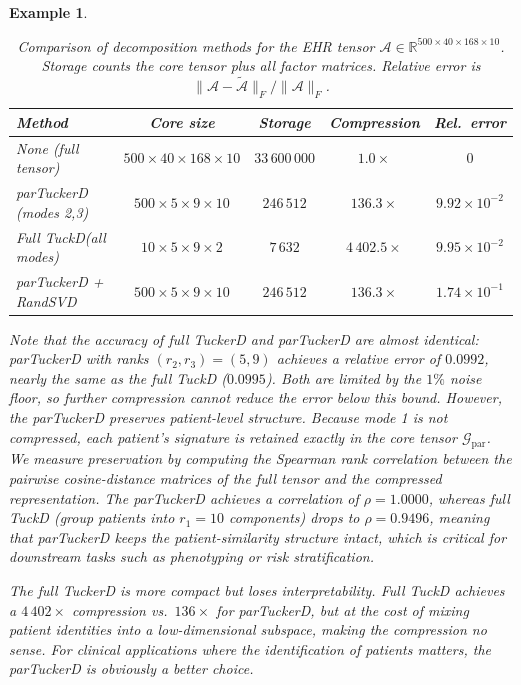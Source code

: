 \documentclass[11pt, oneside]{article}  %
\newtheorem{exm}[thm]{Example}
\newcommand{\RR}{\mathbb{R}}
\newcommand{\A}{\mathcal{A}}
\newcommand{\caG}{\mathcal{G}}
\begin{document}
\begin{exm}
\begin{table}[htbp]
\centering
\caption{Comparison of decomposition methods for the EHR tensor $\A\in\RR^{500\times 40\times 168\times 10}$.  Storage counts the core tensor plus all factor matrices.  Relative error is $\|\A-\widetilde{\A}\|_F/\|\A\|_F$.}
\label{tab:compare}
\begin{tabular}{@{}lcccc@{}}
\toprule
\textbf{Method} & \textbf{Core size} & \textbf{Storage} & \textbf{Compression} & \textbf{Rel.\ error} \\
\midrule
None (full tensor) & $500\!\times\!40\!\times\!168\!\times\!10$ & $33\,600\,000$ & $1.0\times$ & $0$ \\
parTuckerD (modes 2,3) & $500\!\times\!5\!\times\!9\!\times\!10$ & $246\,512$ & $136.3\times$ & $9.92\times 10^{-2}$ \\
Full TuckD(all modes) & $10\!\times\!5\!\times\!9\!\times\!2$ & $7\,632$ & $4\,402.5\times$ & $9.95\times 10^{-2}$ \\
parTuckerD + RandSVD & $500\!\times\!5\!\times\!9\!\times\!10$ & $246\,512$ & $136.3\times$ & $1.74\times 10^{-1}$ \\
\bottomrule
\end{tabular}
\end{table}
Note that the accuracy of full TuckerD and parTuckerD are almost identical: parTuckerD with ranks $(r_2, r_3)=(5, 9)$ achieves a relative error 
of $0.0992$, nearly the same as the full TuckD ($0.0995$).  Both are limited by the $1\%$ noise floor, so further compression cannot reduce the 
error below this bound.  However, the parTuckerD preserves patient-level structure. Because mode 1 is not compressed, each patient's signature is 
retained exactly in the core tensor $\caG_{\text{par}}$.  We measure preservation by computing the Spearman rank correlation between the 
pairwise cosine-distance matrices of the full tensor and the compressed representation. The parTuckerD achieves a correlation of $\rho = 1.0000$, 
whereas full TuckD (group patients into $r_1=10$ components) drops to $\rho =0.9496$, meaning that parTuckerD keeps the patient-similarity 
structure intact, which is critical for downstream tasks such as phenotyping or risk stratification.

The full TuckerD is more compact but loses interpretability. Full TuckD achieves a $4\,402\times$ compression vs.\ $136\times$ for parTuckerD, 
but at the cost of mixing patient identities into a low-dimensional subspace, making the compression no sense.  For clinical applications where 
the identification of patients matters, the parTuckerD is obviously a better choice.  


\end{exm}
\end{document}
